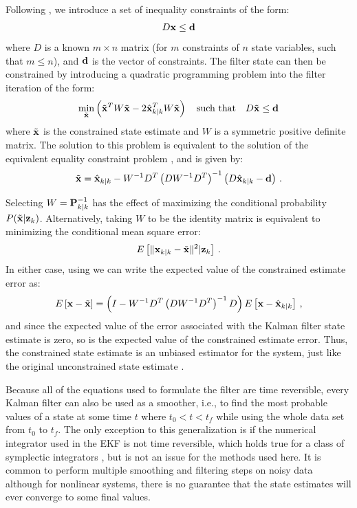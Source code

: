 Following \citet{simon2006}, we introduce a set of inequality constraints of the form:
\begin{equation}
D \mathbf x \le \mathbf d
\end{equation}
where $D$ is a known $m \times n$ matrix (for $m$ constraints of $n$ state variables, such that $m \le n$), and $\mathbf d$ is the vector of constraints.  The filter state can then be constrained by introducing a quadratic programming problem into the filter iteration of the form:
\begin{equation}
 \min_{\tilde{\mathbf x}} \left(\tilde{\mathbf x}^TW\tilde{\mathbf x} - 2 \hat{\mathbf x}_{k|k}^TW\tilde{\mathbf x} \right) \quad\textrm{such that}\quad D \tilde{\mathbf x} \le \mathbf d
\end{equation}
where $\tilde{\mathbf x}$ is the constrained state estimate and $W$ is a symmetric positive definite matrix.  The solution to this problem is equivalent to the solution of the equivalent equality constraint problem \citep{simon2002kalman}, and is given by:
\begin{equation} \label{eq:ineqConstraintSol}
\tilde{\mathbf x} =  \hat{\mathbf x}_{k|k} - W^{-1}D^T\left(D W^{-1}D^T\right)^{-1}\left(D \hat{\mathbf x}_{k|k} - \mathbf d\right) \,.
\end{equation}

 Selecting $W = \mathbf P_{k|k}^{-1}$ has the effect of maximizing the conditional probability $P(\tilde{\mathbf x} | \mathbf z_k)$.  Alternatively, taking $W$ to be the identity matrix is equivalent to minimizing the conditional mean square error:
\begin{equation}
E\left[\Vert  \mathbf x_{k|k} - \tilde{\mathbf x} \Vert^2 | \mathbf z_k \right] \,.
\end{equation}
In either case, using  we can write the expected value of the constrained estimate error as:
\begin{equation}
E\left[\mathbf x - \tilde{\mathbf x}\right] = \left(I - W^{-1}D^T\left(D W^{-1}D^T\right)^{-1}D\right)E\left[\mathbf x - \hat{\mathbf x}_{k|k}\right]  \,,
\end{equation}
and since the expected value of the error associated with the Kalman filter state estimate is zero, so is the expected value of the constrained estimate error.  Thus, the constrained state estimate is an unbiased estimator for the system, just like the original unconstrained state estimate \citep{simon2006}.

Because all of the equations used to formulate the filter are time reversible, every Kalman filter can also be used as a smoother, i.e., to find the most probable values of a state at some time $t$ where $t_0 < t < t_f$ while using the whole data set from $t_0$ to $t_f$.  The only exception to this generalization is if the numerical integrator used in the EKF is not time reversible, which holds true for a class of symplectic integrators \citep{yoshida1993recent}, but is not an issue for the methods used here.  It is common to perform multiple smoothing and filtering steps on noisy data although for nonlinear systems, there is no guarantee that the state estimates will ever converge to some final values.

